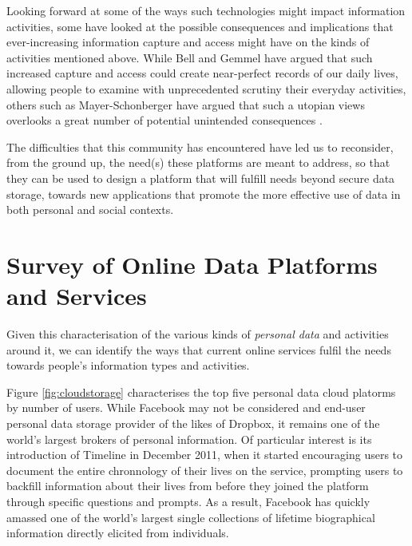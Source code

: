 \documentclass[graybox]{svmult}
\begin{document}

Looking forward at some of the ways such technologies might impact information activities, some have looked at the possible consequences and implications that ever-increasing information capture and access might have on the kinds of activities mentioned above.  While Bell and Gemmel have argued \cite{bell2010total} that such increased capture and access could create near-perfect records of our daily lives, allowing people to examine with unprecedented scrutiny their everyday activities, others such as Mayer-Schonberger have argued that such a utopian views overlooks a great number of potential unintended consequences \cite{mayer-schonberger2013}.   


The difficulties that this community has encountered have led us to reconsider, from the ground up, the need(s) these platforms are meant to address, so that they can be used to design a platform that will fulfill needs beyond secure data storage, towards new applications that promote the more effective use of data in both personal and social contexts.

\section{Survey of Online Data Platforms and Services}

Given this characterisation of the various kinds of \emph{personal data} and activities around it, we can identify the ways that current online services fulfil the needs towards people's information types and activities.

Figure \ref{fig:cloudstorage} characterises the top five personal data cloud platorms by number of users. While Facebook may not be considered and end-user personal data storage provider of the likes of Dropbox, it remains one of the world's largest brokers of personal information.  Of particular interest is its introduction of Timeline in December 2011, when it started encouraging users to document the entire chronnology of their lives on the service, prompting users to backfill information about their lives from before they joined the platform through specific questions and prompts.  As a result, Facebook has quickly amassed one of the world's largest single collections of lifetime biographical information directly elicited from individuals.
\end{document}
